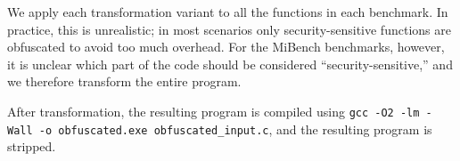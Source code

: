 We apply each transformation variant to all the functions in each benchmark. In practice, this is unrealistic; in most scenarios only security-sensitive functions are obfuscated to avoid too much overhead. For the MiBench benchmarks, however, it is unclear which part of the code should be considered ``security-sensitive,'' and we therefore transform the entire program.


After transformation, the resulting program is compiled using \texttt{gcc -O2 -lm -Wall -o obfuscated.exe obfuscated\_input.c}, and the resulting program is stripped.


\endinput

\AR{Dr.Collberg: Can you add a short description of these options? Just stating it wouldn't make send to a reviewer. Else, how about having a table for this? Transformation | Options | Description}
\subsubsection{Virtualize}
Virtualize involves transforming a function into an interpretor, whose bytecode language is specialized for the particular function specified. 



\begin{itemize}
\item \textit{--VirtualizeDispatch=[direct,indirect and switch]}.
\item \textit{--VirtualizeSuperOpsRatio=[2 and 0]}.
\item \textit{--VirtualizeMaxMergeLength=[5 and 0]}.
\item \textit{--VirtualizePerformance=[AddressSizeShort, CacheTop and PointerStack]}.
\item \textit{--VirtualizeOperands=[stack and registers]}.
\end{itemize}


\subsubsection{AddOpaque}
Split up control flow by adding opaque branches.

\begin{itemize}
\item \textit{--AddOpaqueKinds=[bug and junk]}
\item \textit{--AddOpaqueCount=[1,5,10,15 and 20]}
\end{itemize}


